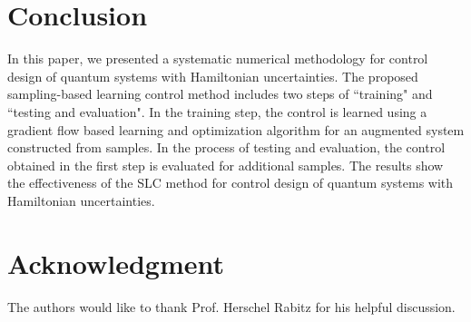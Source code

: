 \documentclass[letterpaper, 10 pt, conference]{ieeeconf}
\begin{document}
\section{Conclusion}\label{Sec5}
In this paper, we presented a systematic numerical methodology for control
design of quantum systems with Hamiltonian uncertainties. The proposed sampling-based learning control method
includes two steps of ``training" and ``testing and evaluation".
In the training step, the control is learned using a gradient flow based
learning and optimization algorithm for an augmented system
constructed from samples. In the process of testing and evaluation, the control
obtained in the first step is evaluated for additional
samples. The results show the effectiveness of the SLC method for
control design of quantum systems with Hamiltonian uncertainties.

\section*{Acknowledgment}
The authors would like to thank Prof. Herschel Rabitz
for his helpful discussion.
\end{document}
